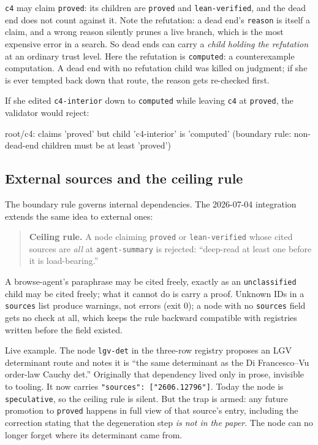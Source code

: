 \documentclass[11pt,a4paper]{article}
\newcommand{\level}[1]{\texttt{#1}}
\begin{document}
\texttt{c4} may claim \level{proved}: its children are \level{proved} and
\level{lean-verified}, and the dead end does not count against it. Note the
refutation: a dead end's \texttt{reason} is itself a claim, and a wrong
reason silently prunes a live branch, which is the most expensive error in a
search. So dead ends can carry a \emph{child holding the refutation} at an
ordinary trust level. Here the refutation is \level{computed}: a
counterexample computation. A dead end with no refutation child was killed
on judgment; if she is ever tempted back down that route, the reason gets
re-checked first.

If she edited \texttt{c4-interior} down to \level{computed} while leaving
\texttt{c4} at \level{proved}, the validator would reject:

\begin{code}
root/c4: claims 'proved' but child 'c4-interior' is 'computed'
(boundary rule: non-dead-end children must be at least 'proved')
\end{code}

\subsection{External sources and the ceiling rule}
\label{sec:ceiling}

The boundary rule governs internal dependencies. The 2026-07-04 integration
extends the same idea to external ones:

\begin{quote}
\textbf{Ceiling rule.} A node claiming \level{proved} or
\level{lean-verified} whose cited sources are \emph{all} at
\level{agent-summary} is rejected: ``deep-read at least one before it is
load-bearing.''
\end{quote}

A browse-agent's paraphrase may be cited freely, exactly as an
\level{unclassified} child may be cited freely; what it cannot do is carry a
proof. Unknown IDs in a \texttt{sources} list produce warnings, not errors
(exit 0); a node with no \texttt{sources} field gets no check at all, which
keeps the rule backward compatible with registries written before the field
existed.

Live example. The node \texttt{lgv-det} in the three-row registry proposes
an LGV determinant route and notes it is ``the same determinant as the
Di Francesco--Vu order-law Cauchy det.'' Originally that dependency lived
only in prose, invisible to tooling. It now carries
\verb|"sources": ["2606.12796"]|. Today the node is \level{speculative}, so
the ceiling rule is silent. But the trap is armed: any future promotion to
\level{proved} happens in full view of that source's entry, including the
correction stating that the degeneration step \emph{is not in the paper}.
The node can no longer forget where its determinant came from.
\end{document}
